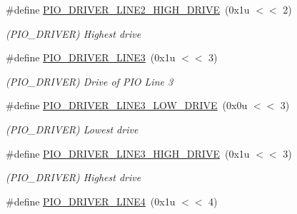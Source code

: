 \begin{DoxyCompactItemize}
\mbox{\label{group__SAMV71__PIO_ga75789b07d9bc1356853119471d98e17b}} 
\#define \mbox{\hyperlink{group__SAMV71__PIO_ga75789b07d9bc1356853119471d98e17b}{P\+I\+O\+\_\+\+D\+R\+I\+V\+E\+R\+\_\+\+L\+I\+N\+E2\+\_\+\+H\+I\+G\+H\+\_\+\+D\+R\+I\+VE}}~(0x1u $<$$<$ 2)
\begin{DoxyCompactList}\small\item\em (P\+I\+O\+\_\+\+D\+R\+I\+V\+ER) Highest drive \end{DoxyCompactList}\item 
\mbox{\label{group__SAMV71__PIO_gabf0102db81f6c2dfcdcbfb51b4773dac}} 
\#define \mbox{\hyperlink{group__SAMV71__PIO_gabf0102db81f6c2dfcdcbfb51b4773dac}{P\+I\+O\+\_\+\+D\+R\+I\+V\+E\+R\+\_\+\+L\+I\+N\+E3}}~(0x1u $<$$<$ 3)
\begin{DoxyCompactList}\small\item\em (P\+I\+O\+\_\+\+D\+R\+I\+V\+ER) Drive of P\+IO Line 3 \end{DoxyCompactList}\item 
\mbox{\label{group__SAMV71__PIO_ga6424654c5b209bd3e9ee165b2f89f7bd}} 
\#define \mbox{\hyperlink{group__SAMV71__PIO_ga6424654c5b209bd3e9ee165b2f89f7bd}{P\+I\+O\+\_\+\+D\+R\+I\+V\+E\+R\+\_\+\+L\+I\+N\+E3\+\_\+\+L\+O\+W\+\_\+\+D\+R\+I\+VE}}~(0x0u $<$$<$ 3)
\begin{DoxyCompactList}\small\item\em (P\+I\+O\+\_\+\+D\+R\+I\+V\+ER) Lowest drive \end{DoxyCompactList}\item 
\mbox{\label{group__SAMV71__PIO_ga96312ddb950bbd2ca33c90f480335372}} 
\#define \mbox{\hyperlink{group__SAMV71__PIO_ga96312ddb950bbd2ca33c90f480335372}{P\+I\+O\+\_\+\+D\+R\+I\+V\+E\+R\+\_\+\+L\+I\+N\+E3\+\_\+\+H\+I\+G\+H\+\_\+\+D\+R\+I\+VE}}~(0x1u $<$$<$ 3)
\begin{DoxyCompactList}\small\item\em (P\+I\+O\+\_\+\+D\+R\+I\+V\+ER) Highest drive \end{DoxyCompactList}\item 
\mbox{\label{group__SAMV71__PIO_gaf4a06c33fc1133a115946354b2c75ccb}} 
\#define \mbox{\hyperlink{group__SAMV71__PIO_gaf4a06c33fc1133a115946354b2c75ccb}{P\+I\+O\+\_\+\+D\+R\+I\+V\+E\+R\+\_\+\+L\+I\+N\+E4}}~(0x1u $<$$<$ 4)
$$
\end{DoxyCompactItemize}
